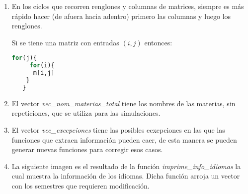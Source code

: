 \begin{enumerate}
%  
%  
%  
%  

  \item En los ciclos que recorren renglones y columnas de matrices, siempre es más rápido hacer (de afuera hacia adentro) primero las columnas y luego los renglones.
  
  Si se tiene una matriz con entradas $(i,j)$ entonces:
  
  \begin{lstlisting}[language=R, caption= \textit{Ejemplo de ciclo for}]
	for(j){
	 for(i){
      m[i,j]
    }
   }
  \end{lstlisting}


  \item El vector \textit{vec\_nom\_materias\_total} tiene los nombres de las materias, sin repeticiones, que se utiliza para las simulaciones.
  
  \item El vector \textit{vec\_excepciones} tiene las posibles ecxepciones en las que las funciones que extraen información pueden caer, de esta manera se pueden generar nuevas funciones para corregir esos casos.
  
  \item La siguiente imagen es el resultado de la función \textit{imprime\_info\_idiomas} la cual muestra la información de los idiomas. Dicha función arroja un vector con los semestres que requieren modificación.


\end{enumerate}
